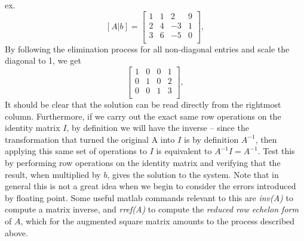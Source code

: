 \documentclass[11pt]{article}
\begin{document}
ex. 
\[
[A | b] = 
\begin{bmatrix}
1 & 1 & 2 & 9 \\
2 & 4 & -3 & 1 \\
3 & 6 & -5 & 0 \\
\end{bmatrix},
\]
By following the elimination process for all non-diagonal entries and scale the diagonal to 1, we get
\[
\begin{bmatrix}
1 & 0 & 0 & 1 \\
0 & 1 & 0 & 2 \\
0 & 0 & 1 & 3 \\
\end{bmatrix},
\]
It should be clear that the solution can be read directly from the rightmost column. Furthermore, if we
carry out the exact same row operations on the identity matrix $I$, by definition we will have the inverse --
since the transformation that turned the original A into $I$ is by definition $A^{-1}$, then applying
this same set of operations to $I$ is equivalent to $A^{-1} I = A^{-1}$. Test this by performing row operations
on the identity matrix and verifying that the result, when multiplied by $b$, gives the solution to the system.
Note that in general this is not a great idea when we begin to consider the errors introduced by floating point.
Some useful matlab commands relevant to this are {\it inv(A)} to compute a matrix inverse, and {\it rref(A)}
to compute the {\it reduced row echelon form} of $A$, which for the augmented square matrix amounts
to the process described above.
\end{document}
